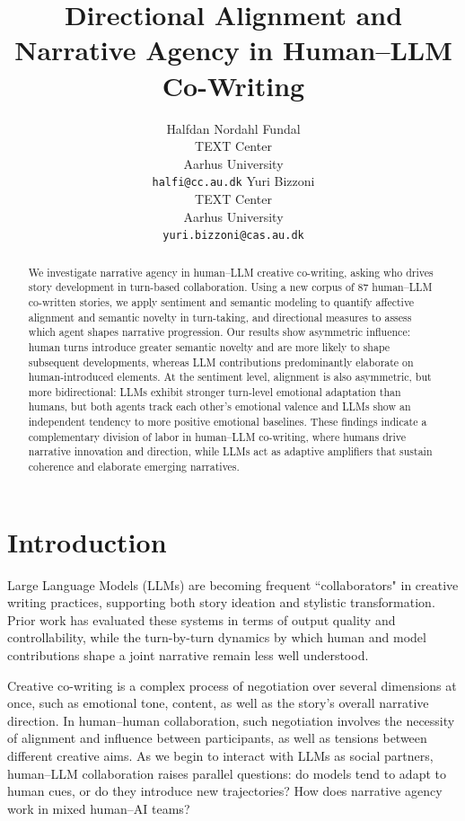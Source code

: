 \documentclass[11pt]{article}
\title{Directional Alignment and Narrative Agency in Human–LLM Co-Writing}
\author{
Halfdan Nordahl Fundal \\
TEXT Center \\
Aarhus University \\
\texttt{halfi@cc.au.dk}
\And
Yuri Bizzoni \\
TEXT Center \\
Aarhus University \\
\texttt{yuri.bizzoni@cas.au.dk}
}
\begin{document}
\maketitle
\begin{abstract}
We investigate narrative agency in human–LLM creative co-writing, asking who drives story development in turn-based collaboration. Using a new corpus of 87 human–LLM co-written stories, we apply sentiment and semantic modeling to quantify affective alignment and semantic novelty in turn-taking, and directional measures to assess which agent shapes narrative progression.
Our results show asymmetric influence: human turns introduce greater semantic novelty and are more likely to shape subsequent developments, whereas LLM contributions predominantly elaborate on human-introduced elements. At the sentiment level, alignment is also asymmetric, but more bidirectional: LLMs exhibit stronger turn-level emotional adaptation than humans, but both agents track each other's emotional valence and LLMs show an independent tendency to more positive emotional baselines. 
These findings indicate a complementary division of labor in human–LLM co-writing, where humans drive narrative innovation and direction, while LLMs act as adaptive amplifiers that sustain coherence and elaborate emerging narratives.


\end{abstract}

\section{Introduction}

Large Language Models (LLMs) are becoming frequent ``collaborators" in creative writing practices, supporting both story ideation and stylistic transformation. Prior work has evaluated these systems in terms of output quality and controllability, while the turn-by-turn dynamics by which human and model contributions shape a joint narrative remain less well understood.

Creative co-writing is a complex process of negotiation over several dimensions at once, such as emotional tone, content, as well as the story's overall narrative direction. In human--human collaboration, such negotiation involves the necessity of alignment and influence between participants, as well as tensions between different creative aims. As we begin to interact with LLMs as social partners, human--LLM collaboration raises parallel questions: do models tend to adapt to human cues, or do they introduce new trajectories? How does narrative agency work in mixed human--AI teams?
\end{document}
